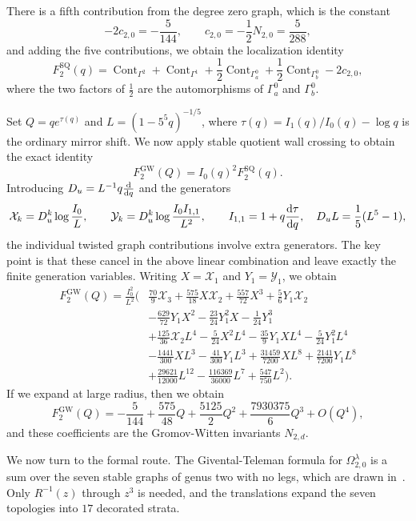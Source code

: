 \documentclass{amsart}
\theoremstyle{definition}
\theoremstyle{remark}
\theoremstyle{plain}
\theoremstyle{definition}
\theoremstyle{remark}
\newcommand{\mc}[1]{\mathcal{#1}}
\newcommand{\mr}[1]{\mathrm{#1}}
\newcommand{\1}{\mathbf{1}}
\newcommand{\2}{\mathbf{2}}
\newcommand{\3}{\mathbf{3}}
\DeclareMathOperator{\Cont}{Cont}
\begin{document}
There is a fifth contribution from the degree zero graph, which is the constant
\[ -2c_{2,0} = -\frac{5}{144}, \qquad c_{2,0} = -\frac{1}{2}N_{2,0} = \frac{5}{288}, \]
and adding the five contributions, we obtain the localization identity
\[ F_2^{\mr{SQ}}(q) = \Cont_{\Gamma^2} + \Cont_{\Gamma^1} + \frac{1}{2}\Cont_{\Gamma_a^0} + \frac{1}{2}\Cont_{\Gamma_b^0} - 2c_{2,0}, \]
where the two factors of \(\frac{1}{2}\) are the automorphisms of \(\Gamma_a^0\) and \(\Gamma_b^0\).

Set \(Q = qe^{\tau(q)}\) and \(L = (1-5^5q)^{-1/5}\), where \(\tau(q) = I_1(q)/I_0(q) - \log q\) is the ordinary mirror shift. We now apply stable quotient wall crossing to obtain the exact identity
\[ F_2^{\mr{GW}}(Q) = I_0(q)^2 F_2^{\mr{SQ}}(q). \]
Introducing \(D_u = L^{-1}q\odv{}{q}\) and the generators
\[ \mc{X}_k = D_u^k \log \frac{I_0}{L}, \qquad \mc{Y}_k = D_u^k \log \frac{I_0I_{1,1}}{L^2}, \qquad I_{1,1} = 1 + q \odv{\tau}{q}, \quad D_u L = \frac{1}{5}(L^5-1), \]
the individual twisted graph contributions involve extra generators. The key point is that these cancel in the above linear combination and leave exactly the finite generation variables. Writing \(X = \mc{X}_1\) and \(Y_1 = \mc{Y}_1\), we obtain
\begin{align*}
    F^{\mr{GW}}_2(Q) = \frac{I_0^2}{L^2}\Big(&\frac{70}{9}\mc{X}_3 + \frac{575}{18}X\mc{X}_2 + \frac{557}{72}X^3 + \frac{5}{6}Y_1\mc{X}_2 \\
    &- \frac{629}{72}Y_1X^2 - \frac{23}{24}Y_1^2 X - \frac{1}{24}Y_1^3 \\
    &+ \frac{125}{36}\mc{X}_2 L^4 - \frac{5}{24}X^2L^4 - \frac{35}{9}Y_1XL^4 - \frac{5}{24}Y_1^2L^4 \\
    &- \frac{1441}{300}XL^3 - \frac{41}{300}Y_1L^3 + \frac{31459}{7200}XL^8 + \frac{2141}{7200}Y_1L^8 \\
    &+ \frac{29621}{12000}L^{12} - \frac{116369}{36000}L^7 + \frac{547}{750}L^2\Big).
\end{align*}
If we expand at large radius, then we obtain
\[ F_2^{\mr{GW}}(Q) = -\frac{5}{144} + \frac{575}{48}Q + \frac{5125}{2}Q^2 + \frac{7930375}{6}Q^3 + O(Q^4), \]
and these coefficients are the Gromov-Witten invariants \(N_{2,d}\).

We now turn to the formal route. The Givental-Teleman formula for \(\Omega^{\lambda}_{2,0}\) is a sum over the seven stable graphs of genus two with no legs, which are drawn in~. Only \(R^{-1}(z)\) through \(z^3\) is needed, and the translations expand the seven topologies into \(17\) decorated strata.
\end{document}
